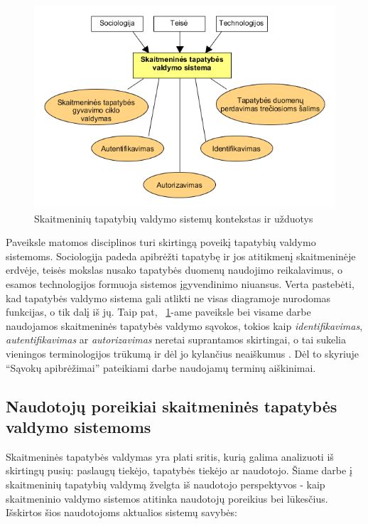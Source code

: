 \begin{figure}[H]
    \centering
    \includegraphics[scale=0.8]{img/IDMcontextAndUsecases}
    \caption{Skaitmeninių tapatybių valdymo sistemų kontekstas ir užduotys \cite{Glasser2009}}
    \label{fig:IDMContext}
\end{figure}

Paveiksle matomos disciplinos turi skirtingą poveikį tapatybių valdymo sistemoms. 
Sociologija padeda apibrėžti tapatybę ir jos atitikmenį skaitmeninėje erdvėje, teisės mokslas nusako tapatybės duomenų naudojimo reikalavimus,
o esamos technologijos formuoja sistemos įgyvendinimo niuansus. Verta pastebėti, kad tapatybės valdymo sistema gali atlikti ne visas
diagramoje nurodomas funkcijas, o tik dalį iš jų. Taip pat, ~\ref{fig:IDMContext}-ame paveiksle bei visame darbe naudojamos skaitmeninės tapatybės valdymo sąvokos,
tokios kaip \textit{identifikavimas}, \textit{autentifikavimas} ar \textit{autorizavimas} neretai suprantamos skirtingai, o tai sukelia
vieningos terminologijos trūkumą ir dėl jo kylančius neaiškumus \cite{Glasser2009}. Dėl to skyriuje
\enquote{Sąvokų apibrėžimai} pateikiami darbe naudojamų terminų aiškinimai.

\subsection{Naudotojų poreikiai skaitmeninės tapatybės valdymo sistemoms} \label{section:IDMcharacteristics}

Skaitmeninės tapatybės valdymas yra plati sritis, kurią galima analizuoti iš skirtingų pusių: paslaugų tiekėjo, tapatybės tiekėjo ar naudotojo.
Šiame darbe į skaitmeninių tapatybių valdymą žvelgta iš naudotojo perspektyvos - kaip skaitmeninio valdymo sistemos atitinka naudotojų poreikius
bei lūkesčius. Išskirtos šios naudotojoms aktualios sistemų savybės:

